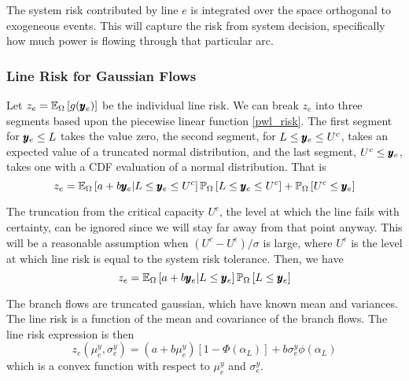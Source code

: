 The system risk contributed by line $e$ is integrated over the space orthogonal to exogeneous events.  This will capture the risk from system decision, specifically how much power is flowing through that particular arc.  

\subsubsection*{Line Risk for Gaussian Flows}
Let $ z_e = \mathbb{E}_{\Omega} \left[ g(\pmb{y}_e) \right] $ be the individual line risk. We can break $z_e$ into three segments based upon the piecewise linear function \ref{pwl_risk}.  The first segment for $\pmb{y}_e \leq L$ takes the value zero, the second segment, for $L \leq \pmb{y}_e \leq U^c$, takes an expected value of a truncated normal distribution, and the last segment, $U^c \leq \pmb{y}_e$, takes one with a CDF evaluation of a normal distribution.  That is
\[ z_e = \mathbb{E}_{\Omega} \left[  a+b\pmb{y}_e | L \leq \pmb{y}_e \leq U^c  \right] \mathbb{P}_{\Omega} \left[ L\leq \pmb{y}_e \leq U^c \right]  + \mathbb{P}_{\Omega} \left[  U^c \leq \pmb{y}_e  \right] \] 

 The truncation from the critical capacity $U^c$, the level at which the line fails with certainty, can be ignored since we will stay far away from that point anyway.  This will be a reasonable assumption when $ (U^c - U^{\epsilon} )/\sigma $ is large, where $U^\epsilon$ is the level at which line risk is equal to the system risk tolerance.  Then, we have
\[ z_e = \mathbb{E}_{\Omega} \left[  a+b\pmb{y}_e | L \leq \pmb{y}_e  \right] \mathbb{P}_{\Omega} \left[ L\leq \pmb{y}_e \right] \]

The branch flows are truncated gaussian, which have known mean and variances.
\endnote{}
The line risk is a function of the mean and covariance of the branch flows.  The line risk expression is then
\begin{equation}\label{line_risk}
z_e(\mu^y_e,\sigma^y_e) = (a + b \mu^y_e)\left[ 1 - \Phi(\alpha_L) \right]  + b \sigma^y_e \phi(\alpha_L) 
\end{equation}
which is a convex function with respect to $\mu^y_e$ and $\sigma^y_e$.
\endnote{}


